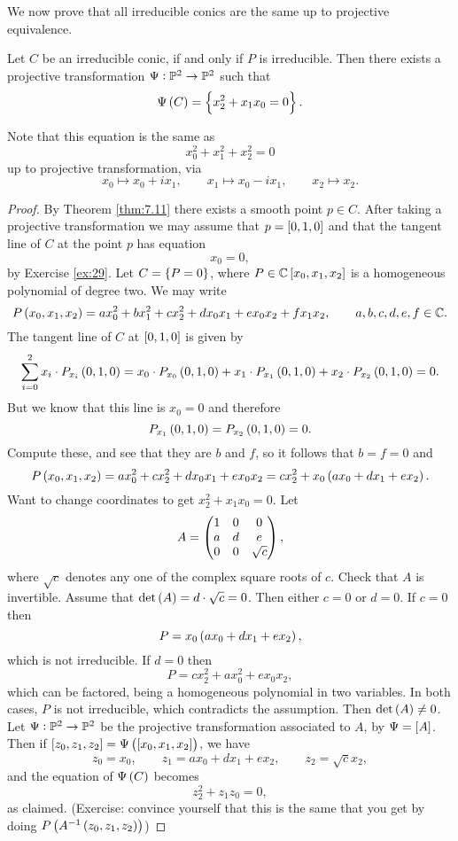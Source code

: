 We now prove that all irreducible conics are the same up to projective equivalence.

\begin{theorem}
\label{thm:10.2}
Let $ C $ be an irreducible conic, if and only if $ P $ is irreducible. Then there exists a projective transformation $ \Psi : \P^2 \to \P^2 $ such that
$$ \Psi\br{C} = \cbr{x_2^2 + x_1x_0 = 0}. $$
\end{theorem}

\begin{remark}
Note that this equation is the same as
$$ x_0^2 + x_1^2 + x_2^2 = 0 $$
up to projective transformation, via
$$ x_0 \mapsto x_0 + ix_1, \qquad x_1 \mapsto x_0 - ix_1, \qquad x_2 \mapsto x_2. $$
\end{remark}

\begin{proof}
By Theorem \ref{thm:7.11} there exists a smooth point $ p \in C $. After taking a projective transformation we may assume that $ p = \sbr{0, 1, 0} $ and that the tangent line of $ C $ at the point $ p $ has equation
$$ x_0 = 0, $$
by Exercise \ref{ex:29}. Let $ C = \cbr{P = 0} $, where $ P \in \C\sbr{x_0, x_1, x_2} $ is a homogeneous polynomial of degree two. We may write
$$ P\br{x_0, x_1, x_2} = ax_0^2 + bx_1^2 + cx_2^2 + dx_0x_1 + ex_0x_2 + fx_1x_2, \qquad a, b, c, d, e, f \in \C. $$
The tangent line of $ C $ at $ \sbr{0, 1, 0} $ is given by
$$ \sum_{i = 0}^2 x_i \cdot P_{x_i}\br{0, 1, 0} = x_0 \cdot P_{x_0}\br{0, 1, 0} + x_1 \cdot P_{x_1}\br{0, 1, 0} + x_2 \cdot P_{x_2}\br{0, 1, 0} = 0. $$
But we know that this line is $ x_0 = 0 $ and therefore
$$ P_{x_1}\br{0, 1, 0} = P_{x_2}\br{0, 1, 0} = 0. $$
Compute these, and see that they are $ b $ and $ f $, so it follows that $ b = f = 0 $ and
$$ P\br{x_0, x_1, x_2} = ax_0^2 + cx_2^2 + dx_0x_1 + ex_0x_2 = cx_2^2 + x_0\br{ax_0 + dx_1 + ex_2}. $$
Want to change coordinates to get $ x_2^2 + x_1x_0 = 0 $. Let
$$ A = \threebythree{1}{0}{0}{a}{d}{e}{0}{0}{\sqrt{c}}, $$
where $ \sqrt{c} $ denotes any one of the complex square roots of $ c $. Check that $ A $ is invertible. Assume that $ \det\br{A} = d \cdot \sqrt{c} = 0 $. Then either $ c = 0 $ or $ d = 0 $. If $ c = 0 $ then
$$ P = x_0\br{ax_0 + dx_1 + ex_2}, $$
which is not irreducible. If $ d = 0 $ then
$$ P = cx_2^2 + ax_0^2 + ex_0x_2, $$
which can be factored, being a homogeneous polynomial in two variables. In both cases, $ P $ is not irreducible, which contradicts the assumption. Then $ \det\br{A} \ne 0 $. Let $ \Psi : \P^2 \to \P^2 $ be the projective transformation associated to $ A $, by $ \Psi = \sbr{A} $. Then if $ \sbr{z_0, z_1, z_2} = \Psi\br{\sbr{x_0, x_1, x_2}} $, we have
$$ z_0 = x_0, \qquad z_1 = ax_0 + dx_1 + ex_2, \qquad z_2 = \sqrt{c}x_2, $$
and the equation of $ \Psi\br{C} $ becomes
$$ z_2^2 + z_1z_0 = 0, $$
as claimed. (Exercise: convince yourself that this is the same that you get by doing $ P\br{A^{-1}\br{z_0, z_1, z_2}} $)
\end{proof}

